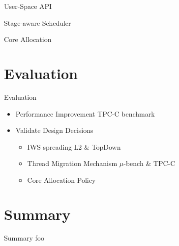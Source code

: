 \documentclass{beamer}
\begin{document}
\begin{frame}{User-Space API}

\end{frame}

\begin{frame}{Stage-aware Scheduler}

\end{frame}

\begin{frame}{Core Allocation}

\end{frame}

\section{Evaluation}
\begin{frame}{Evaluation}
    \begin{itemize}
        \item Performance Improvement \follow TPC-C benchmark
        \item Validate Design Decisions
            \begin{itemize}
                \item IWS spreading \follow L2 \& TopDown
                \item Thread Migration Mechanism \follow $\mu$-bench \& TPC-C
                \item Core Allocation Policy
            \end{itemize}
    \end{itemize}
\end{frame}

\section{Summary}
\begin{frame}{Summary}
    foo
\end{frame}
\end{document}
